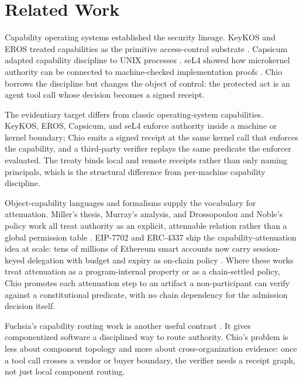 \section{Related Work}

Capability operating systems established the security lineage. KeyKOS and EROS treated capabilities as the primitive access-control substrate \cite{hardy1985keykos,shapiro1999eros}. Capsicum adapted capability discipline to UNIX processes \cite{watson2010capsicum}. seL4 showed how microkernel authority can be connected to machine-checked implementation proofs \cite{klein2009sel4,sewell2013sel4}. Chio borrows the discipline but changes the object of control: the protected act is an agent tool call whose decision becomes a signed receipt.

The evidentiary target differs from classic operating-system capabilities. KeyKOS, EROS, Capsicum, and seL4 enforce authority inside a machine or kernel boundary; Chio emits a signed receipt at the same kernel call that enforces the capability, and a third-party verifier replays the same predicate the enforcer evaluated. The treaty binds local and remote receipts rather than only naming principals, which is the structural difference from per-machine capability discipline.

Object-capability languages and formalisms supply the vocabulary for attenuation. Miller's thesis, Murray's analysis, and Drossopoulou and Noble's policy work all treat authority as an explicit, attenuable relation rather than a global permission table \cite{miller2006composition,murray2010ocap,drossopoulou2013policy,drossopoulou2011authority}. EIP-7702 and ERC-4337 ship the capability-attenuation idea at scale: tens of millions of Ethereum smart accounts now carry session-keyed delegation with budget and expiry as on-chain policy \cite{eip7702}. Where these works treat attenuation as a program-internal property or as a chain-settled policy, Chio promotes each attenuation step to an artifact a non-participant can verify against a constitutional predicate, with no chain dependency for the admission decision itself.

Fuchsia's capability routing work is another useful contrast \cite{fuchsiaCapabilities}. It gives componentized software a disciplined way to route authority. Chio's problem is less about component topology and more about cross-organization evidence: once a tool call crosses a vendor or buyer boundary, the verifier needs a receipt graph, not just local component routing.

